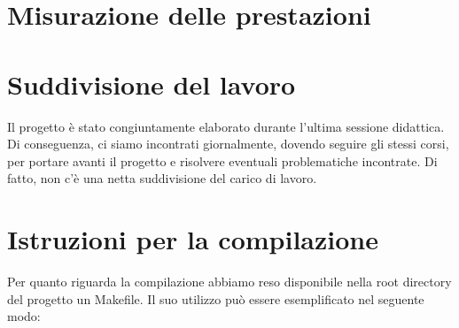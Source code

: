 \documentclass{article}
\begin{document}
\section{Misurazione delle prestazioni}



\section{Suddivisione del lavoro}
Il progetto è stato congiuntamente elaborato durante l'ultima sessione didattica. Di conseguenza, ci siamo incontrati giornalmente, dovendo seguire gli stessi corsi, per portare avanti il progetto e risolvere eventuali problematiche incontrate. Di fatto, non c'è una netta suddivisione del carico di lavoro.

\section{Istruzioni per la compilazione}
Per quanto riguarda la compilazione abbiamo reso disponibile nella root directory del progetto un Makefile. Il suo utilizzo può essere esemplificato nel seguente modo:
\end{document}
